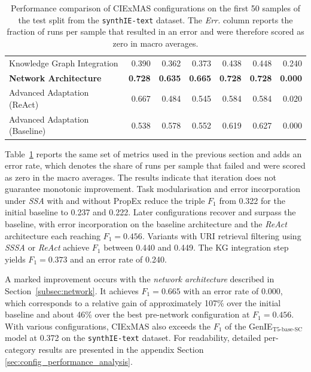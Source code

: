 \documentclass[a4paper,oneside,bibliography=totoc]{scrbook}
\begin{document}
\begin{table}[h]
\begin{tabular}{p{5cm}|rrrrrr}
    Knowledge Graph Integration                           & 0.390                                         & 0.362          & 0.373          & 0.438          & 0.448          & 0.240          \\
    \textbf{Network Architecture}                         & \textbf{0.728}                                & \textbf{0.635} & \textbf{0.665} & \textbf{0.728} & \textbf{0.728} & \textbf{0.000} \\
    Advanced Adaptation (ReAct)                           & 0.667                                         & 0.484          & 0.545          & 0.584          & 0.584          & 0.020          \\
    Advanced Adaptation (Baseline)                        & 0.538                                         & 0.578          & 0.552          & 0.619          & 0.627          & 0.000          \\
    \bottomrule
  \end{tabular}
  \caption{Performance comparison of CIExMAS configurations on the first 50 samples of the test split from the \texttt{synthIE\allowbreak-text} dataset. The \emph{Err.} column reports the fraction of runs per sample that resulted in an error and were therefore scored as zero in macro averages.}
  \label{tab:evaluation_iterations}
\end{table}

Table~\ref{tab:evaluation_iterations} reports the same set of metrics used in the previous section and adds an error rate, which denotes the share of runs per sample that failed and were scored as zero in the macro averages. The results indicate that iteration does not guarantee monotonic improvement. Task modularisation and error incorporation under \textit{\ac{SSA}} with and without \ac{PropEx} reduce the triple $F_1$ from 0.322 for the initial baseline to 0.237 and 0.222. Later configurations recover and surpass the baseline, with error incorporation on the baseline architecture and the \textit{ReAct} architecture each reaching $F_1=0.456$. Variants with \ac{URI} retrieval filtering using \textit{\ac{SSSA}} or \textit{ReAct} achieve $F_1$ between 0.440 and 0.449. The \ac{KG} integration step yields $F_1=0.373$ and an error rate of 0.240.

A marked improvement occurs with the \textit{network architecture} described in Section~\ref{subsec:network}. It achieves $F_1=0.665$ with an error rate of 0.000, which corresponds to a relative gain of approximately 107\% over the initial baseline and about 46\% over the best pre-network configuration at $F_1=0.456$. With various configurations, CIExMAS also exceeds the $F_1$ of the GenIE$_{\text{T5-base-SC}}$ model at 0.372 on the \texttt{synthIE-text} dataset. For readability, detailed per-category results are presented in the appendix Section \ref{sec:config_performance_analysis}.
\end{document}
